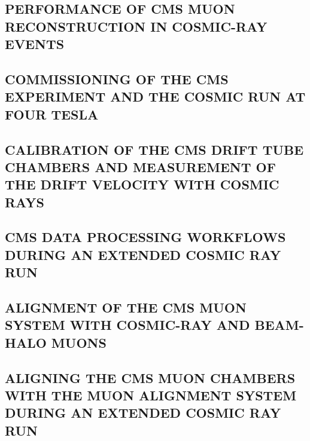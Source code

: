 \documentclass[a4paper, 11pt, twoside, openright]{report}
\begin{document}
\subsection{PERFORMANCE OF CMS MUON RECONSTRUCTION IN COSMIC-RAY EVENTS}


\subsection{COMMISSIONING OF THE CMS EXPERIMENT AND THE COSMIC RUN AT FOUR TESLA}


\subsection{CALIBRATION OF THE CMS DRIFT TUBE CHAMBERS AND MEASUREMENT OF THE DRIFT VELOCITY WITH COSMIC RAYS}


\subsection{CMS DATA PROCESSING WORKFLOWS DURING AN EXTENDED COSMIC RAY RUN}


\subsection{ALIGNMENT OF THE CMS MUON SYSTEM WITH COSMIC-RAY AND BEAM-HALO MUONS}


\subsection{ALIGNING THE CMS MUON CHAMBERS WITH THE MUON ALIGNMENT SYSTEM DURING AN EXTENDED COSMIC RAY RUN}

\end{document}
